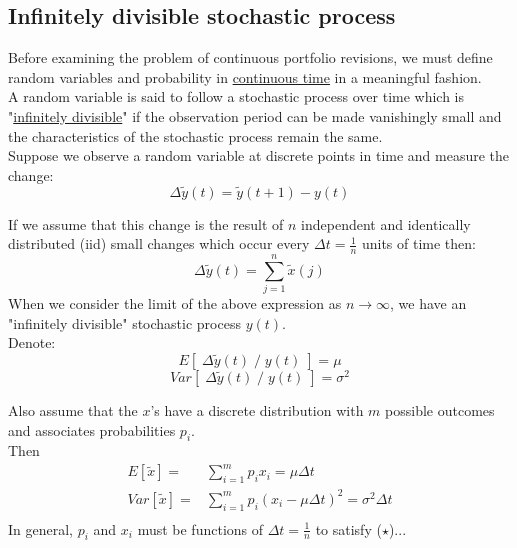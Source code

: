 \documentclass[
14pt,notheorems,hyperref={pdfauthor=whatever}
]{beamer}
\begin{document}
\subsection{Infinitely divisible stochastic process}
\begin{frame}
Before examining the problem of continuous portfolio revisions, we must define random variables and probability in \underline{continuous time} in a meaningful fashion.\\
\hfill\break
A random variable is said to follow a stochastic process over time which is "\underline{infinitely divisible}" if the observation period can be made vanishingly small and the characteristics of the stochastic process remain the same.\\
\hfill\break
Suppose we observe a random variable at discrete points in time and measure the change:\\
\[\Delta \tilde y(t) = \tilde y(t+1)-y(t)\]
\end{frame}

\begin{frame}
If we assume that this change is the result of $n$ independent and identically distributed (iid) small changes which occur every $\Delta t = \frac{1}{n}$ units of time then:\\
\[\Delta \tilde y(t) = \sum_{j=1}^n \tilde x(j)\]
When we consider the limit of the above expression as $n\to\infty$, we have an "infinitely divisible" stochastic process $y(t)$.\\
\hfill\break
Denote:\\
\[E[\;\Delta \tilde y(t) \;/\; y(t)\;] = \mu\]
\[Var[\;\Delta \tilde y(t) \;/\; y(t)\;] = \sigma^2\]
\end{frame}

\begin{frame}
Also assume that the $x$'s have a discrete distribution with $m$ possible outcomes and associates probabilities $p_i$.\\
Then\\
\begin{align*}
    E[\tilde x] =& \sum_{i=1}^m p_i x_i = \mu \Delta t\\
    \tag{$\star$}
    Var[\tilde x] =& \sum_{i=1}^m p_i (x_i-\mu \Delta t)^2 = \sigma^2 \Delta t\\
\end{align*}
In general, $p_i$ and $x_i$ must be functions of $\Delta t = \frac{1}{n}$ to satisfy ($\star$)...
\end{frame}
\end{document}
